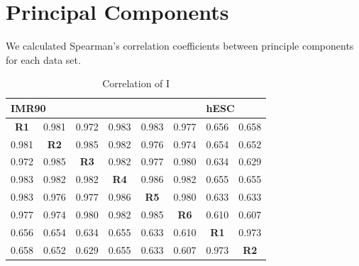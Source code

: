 \newpage
\section*{Principal Components}

We calculated Spearman's correlation coefficients between principle components for each data set.

\begin{table}[H]
  \centering
  \caption{Correlation of  I}\label{table:PC1Correlations}
  \begin{tabularx}{\textwidth}{@{}cccccccc@{}}
    \toprule
    \multicolumn{6}{l}{IMR90} & \multicolumn{2}{l}{hESC} \\
    \midrule
    \textbf{R1} & 0.981       & 0.972       & 0.983       & 0.983       & 0.977       & 0.656       & 0.658 \\
    0.981       & \textbf{R2} & 0.985       & 0.982       & 0.976       & 0.974       & 0.654       & 0.652 \\
    0.972       & 0.985       & \textbf{R3} & 0.982       & 0.977       & 0.980       & 0.634       & 0.629 \\
    0.983       & 0.982       & 0.982       & \textbf{R4} & 0.986       & 0.982       & 0.655       & 0.655 \\
    0.983       & 0.976       & 0.977       & 0.986       & \textbf{R5} & 0.980       & 0.633       & 0.633 \\
    0.977       & 0.974       & 0.980       & 0.982       & 0.985       & \textbf{R6} & 0.610       & 0.607 \\
    0.656       & 0.654       & 0.634       & 0.655       & 0.633       & 0.610       & \textbf{R1} & 0.973  \\
    0.658       & 0.652       & 0.629       & 0.655       & 0.633       & 0.607       & 0.973       & \textbf{R2}    \\
    \bottomrule
  \end{tabularx}
\end{table}

